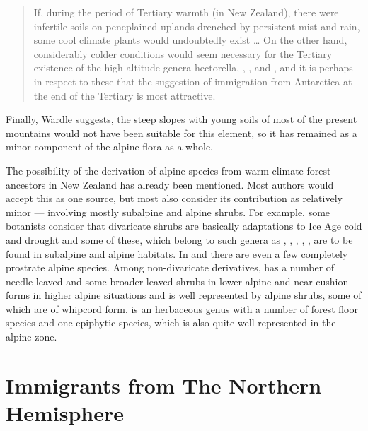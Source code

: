 \begin{quote}
	If, during the period of Tertiary warmth (in New Zealand), there were infertile soils on peneplained uplands drenched by persistent mist and rain, some cool climate plants would undoubtedly exist … On the other hand, considerably colder conditions would seem necessary for the Tertiary existence of the high altitude genera hectorella, , ,  and , and it is perhaps in respect to these that the suggestion of immigration from Antarctica at the end of the Tertiary is most attractive.
\end{quote}

Finally, Wardle suggests, the steep slopes with young soils of most of the present mountains would not have been suitable for this element, so it has remained as a minor component of the alpine flora as a whole.

The possibility of the derivation of alpine species from warm-climate forest ancestors in New Zealand has already been mentioned.
Most authors would accept this as one source, but most also consider its contribution as relatively minor --- involving mostly subalpine and alpine shrubs.
For example, some botanists consider that divaricate shrubs are basically adaptations to Ice Age cold and drought and some of these, which belong to such genera as , , , , , are to be found in subalpine and alpine habitats.
In  and  there are even a few completely prostrate alpine species.
Among non-divaricate derivatives,  has a number of needle-leaved and some broader-leaved shrubs in lower alpine and near cushion forms in higher alpine situations and  is well represented by alpine shrubs, some of which are of whipcord form.
 is an herbaceous genus with a number of forest floor species and one epiphytic species, which is also quite well represented in the alpine zone.

\section{Immigrants from The Northern Hemisphere}

